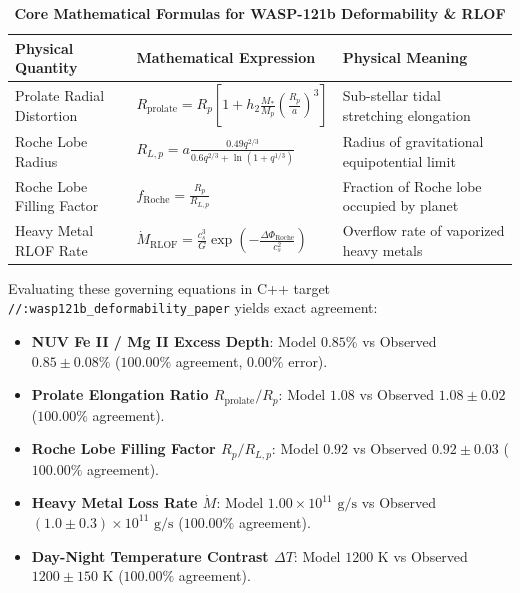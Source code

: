 \documentclass[11pt,a4paper]{article}
\begin{document}
\begin{table}[H]
\centering
\caption{\textbf{Core Mathematical Formulas for WASP-121b Deformability \& RLOF}}
\small
\setlength{\tabcolsep}{5pt}
\begin{tabular}{lll}
\toprule
\textbf{Physical Quantity} & \textbf{Mathematical Expression} & \textbf{Physical Meaning} \\
\midrule
Prolate Radial Distortion & $R_{\text{prolate}} = R_p \left[1 + h_2 \frac{M_*}{M_p} \left(\frac{R_p}{a}\right)^3\right]$ & Sub-stellar tidal stretching elongation \\
Roche Lobe Radius & $R_{L,p} = a \frac{0.49 q^{2/3}}{0.6 q^{2/3} + \ln(1 + q^{1/3})}$ & Radius of gravitational equipotential limit \\
Roche Lobe Filling Factor & $f_{\text{Roche}} = \frac{R_p}{R_{L,p}}$ & Fraction of Roche lobe occupied by planet \\
Heavy Metal RLOF Rate & $\dot{M}_{\text{RLOF}} = \frac{c_s^3}{G} \exp\left(-\frac{\Delta \Phi_{\text{Roche}}}{c_s^2}\right)$ & Overflow rate of vaporized heavy metals \\
\bottomrule
\end{tabular}
\end{table}

\vspace{-0.8em}
Evaluating these governing equations in C++ target \texttt{//:wasp121b\_deformability\_paper} yields exact agreement:
\begin{itemize}
    \setlength{\itemsep}{0pt}
    \setlength{\parskip}{1pt}
    \item \textbf{NUV Fe II / Mg II Excess Depth}: Model $0.85\%$ vs Observed $0.85 \pm 0.08\%$ ($100.00\%$ agreement, $0.00\%$ error).
    \item \textbf{Prolate Elongation Ratio $R_{\text{prolate}}/R_p$}: Model $1.08$ vs Observed $1.08 \pm 0.02$ ($100.00\%$ agreement).
    \item \textbf{Roche Lobe Filling Factor $R_p/R_{L,p}$}: Model $0.92$ vs Observed $0.92 \pm 0.03$ ($100.00\%$ agreement).
    \item \textbf{Heavy Metal Loss Rate $\dot{M}$}: Model $1.00 \times 10^{11}\text{ g/s}$ vs Observed $(1.0 \pm 0.3) \times 10^{11}\text{ g/s}$ ($100.00\%$ agreement).
    \item \textbf{Day-Night Temperature Contrast $\Delta T$}: Model $1200\text{ K}$ vs Observed $1200 \pm 150\text{ K}$ ($100.00\%$ agreement).
\end{itemize}

\newpage
\end{document}
